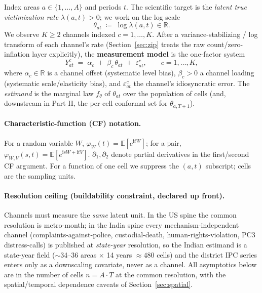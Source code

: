 \documentclass[11pt]{article}
\theoremstyle{definition}
\newcommand{\R}{\mathbb{R}}
\newcommand{\E}{\mathbb{E}}
\newcommand{\ii}{\mathrm{i}}          %
\newcommand{\Th}{\theta}
\newcommand{\lat}{\Th}
\begin{document}
Index areas $a\in\{1,\dots,A\}$ and periods $t$. The scientific target is the
\emph{latent true victimization rate} $\lambda(a,t)>0$; we work on the log
scale
\[
  \lat_{at} \;\coloneqq\; \log\lambda(a,t)\in\R .
\]
We observe $K\ge 2$ channels indexed $c=1,\dots,K$. After a variance-stabilizing
/ log transform of each channel's rate (Section~\ref{sec:zip} treats the raw
count/zero-inflation layer explicitly), the \textbf{measurement model} is the
one-factor system
\begin{equation}\label{eq:model}
  Y^{c}_{at} \;=\; \alpha_c \;+\; \beta_c\,\lat_{at} \;+\; \varepsilon^{c}_{at},
  \qquad c=1,\dots,K,
\end{equation}
where $\alpha_c\in\R$ is a channel offset (systematic level bias),
$\beta_c>0$ a channel loading (systematic scale/elasticity bias), and
$\varepsilon^c_{at}$ the channel's idiosyncratic error. The
\emph{estimand} is the marginal law $f_{\lat}$ of $\lat_{at}$ over the
population of cells (and, downstream in Part II, the per-cell conformal set for
$\lat_{a,T+1}$).

\paragraph{Characteristic-function (CF) notation.}
For a random variable $W$, $\varphi_W(t)=\E[e^{\ii t W}]$; for a pair,
$\varphi_{W,V}(s,t)=\E[e^{\ii s W+\ii t V}]$. $\partial_1,\partial_2$ denote
partial derivatives in the first/second CF argument. For a function of one
cell we suppress the $(a,t)$ subscript; cells are the sampling units.

\paragraph{Resolution ceiling (buildability constraint, declared up front).}
Channels must measure the \emph{same} latent unit. In the US spine the common
resolution is metro-month; in the India spine every mechanism-independent
channel (complaints-against-police, custodial-death, human-rights-violation,
PC3 distress-calls) is published at \emph{state-year} resolution, so the Indian
estimand is a state-year field ($\sim$34--36 areas $\times$ 14 years
$\approx 480$ cells) and the district IPC series enters only as a downscaling
covariate, never as a channel. All asymptotics below are in the number of
cells $n=A\cdot T$ at the common resolution, with the spatial/temporal
dependence caveats of Section~\ref{sec:spatial}.

\end{document}
